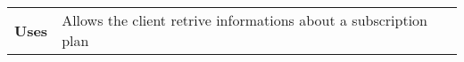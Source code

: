 \begin{adjustwidth}{1cm}{}
\begin{tabular}{|c|l|}
\begin{minipage}[t]{0.7\textwidth}
              \end{minipage} \\
              \hline
            \textbf{Uses} & Allows the client retrive informations about a subscription plan \\
            \hline
        \end{tabular}
    \end{adjustwidth}
    
    
    
    
    
    
    
    
    
    
    
    
    
    
    
    
    
    
    
    
    
